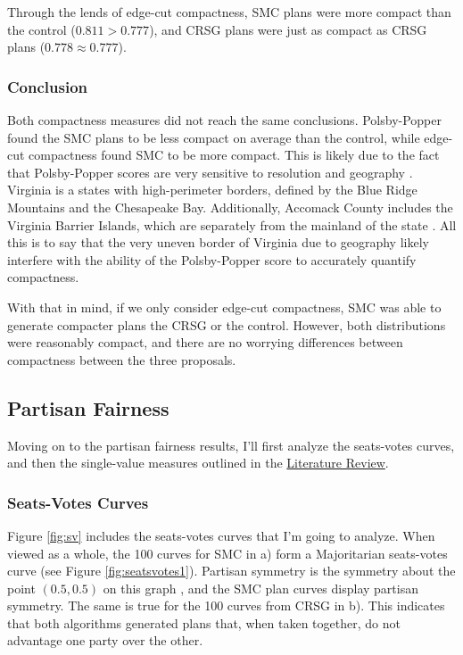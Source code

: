 Through the lends of edge-cut compactness, SMC plans were more compact than the control ($0.811 > 0.777$), and CRSG plans were just as compact as CRSG plans ($0.778 \approx 0.777$). 

\subsubsection{Conclusion}

Both compactness measures did not reach the same conclusions. Polsby-Popper found the SMC plans to be less compact on average than the control, while edge-cut compactness found SMC to be more compact. This is likely due to the fact that Polsby-Popper scores are very sensitive to resolution and geography \parencite{mccartan2020}. Virginia is a states with high-perimeter borders, defined by the Blue Ridge Mountains and the Chesapeake Bay. Additionally, Accomack County includes the Virginia Barrier Islands, which are separately from the mainland of the state \parencite{unitedstatesgeologicalsurvey2021}. All this is to say that the very uneven border of Virginia due to geography likely interfere with the ability of the Polsby-Popper score to accurately quantify compactness. 

With that in mind, if we only consider edge-cut compactness, SMC was able to generate compacter plans the CRSG or the control. However, both distributions were reasonably compact, and there are no worrying differences between compactness between the three proposals. 

\subsection{Partisan Fairness}

Moving on to the partisan fairness results, I'll first analyze the seats-votes curves, and then the single-value measures outlined in the \hyperref[sec:litreview]{Literature Review}. 

\subsubsection{Seats-Votes Curves}

Figure \ref{fig:sv} includes the seats-votes curves that I'm going to analyze. When viewed as a whole, the 100 curves for SMC in a) form a Majoritarian seats-votes curve (see Figure \ref{fig:seatsvotes1}). Partisan symmetry is the symmetry about the point $(0.5, 0.5)$ on this graph \parencite{katz2020}, and the SMC plan curves display partisan symmetry. The same is true for the 100 curves from CRSG in b). This indicates that both algorithms generated plans that, when taken together, do not advantage one party over the other. 

